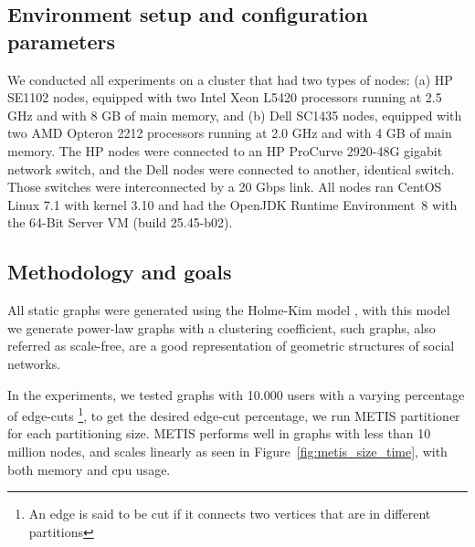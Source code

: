 \subsection{Environment setup and configuration parameters}
\label{sec:evaluation:setup}

We conducted all experiments on a cluster that had two types of nodes: (a) HP SE1102 nodes, equipped with two Intel Xeon L5420 processors running at 2.5 GHz and with 8 GB of main memory, and (b) Dell SC1435 nodes, equipped with two AMD Opteron 2212 processors running at 2.0 GHz and with 4 GB of main memory. The HP nodes were connected to an HP ProCurve 2920-48G gigabit network switch, and the Dell nodes were connected to another, identical switch. Those switches were interconnected by a 20 Gbps link.
All nodes ran CentOS Linux 7.1 with kernel 3.10 and had the OpenJDK Runtime Environment~8 with the \mbox{64-Bit} Server VM (build 25.45-b02).


\subsection{Methodology and goals}
\label{sec:evaluation:methodology}
All static graphs were generated using the Holme-Kim model \cite{holme-kim}, with this model we generate power-law
graphs with a clustering coefficient, such graphs, also referred as scale-free, are a good representation
of geometric structures of social networks.

In the experiments, we tested graphs with 10.000 users with a varying percentage of edge-cuts \footnote{An edge is said to be cut if it connects two vertices that are in different partitions}, to get the desired edge-cut
percentage, we run METIS partitioner for each partitioning size. METIS performs well in graphs with less than 10 million nodes, and scales linearly as seen in Figure~\ref{fig:metis_size_time}, with both memory and cpu usage.


